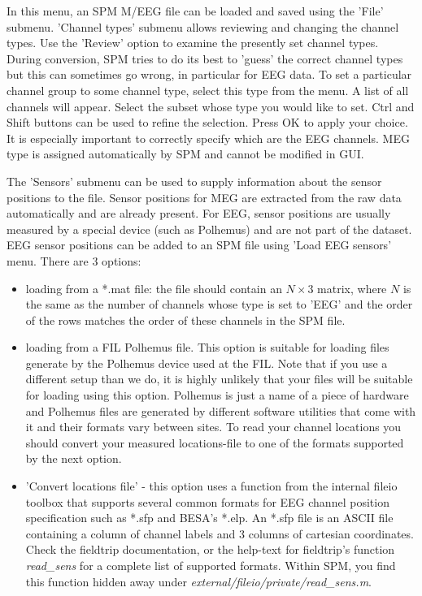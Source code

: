 In this menu, an SPM M/EEG file can be loaded and saved using the 'File'
submenu. 'Channel types' submenu allows reviewing and
changing the channel types. Use the 'Review' option to examine the
presently set channel types. During conversion, SPM tries to do its
best to 'guess' the correct channel types but this can sometimes go
wrong, in particular for EEG data. To set a particular channel group
to some channel type, select this type from the menu. A list of all
channels will appear. Select the subset whose type you would like to
set. Ctrl and Shift buttons can be used to refine the selection. Press
OK to apply your choice. It is especially important to correctly specify
which are the EEG channels. MEG type is assigned automatically by SPM
and cannot be modified in GUI.  

The 'Sensors' submenu can be used to supply information about the
sensor positions to the file. Sensor positions for MEG are extracted
from the raw data automatically and are already present. For EEG,
sensor positions are usually measured by a special device (such as
Polhemus) and are not part of the dataset. EEG sensor positions can be
added to an SPM file using 'Load EEG sensors' menu. There are 3
options:

\begin{itemize}
\item	loading from a *.mat file: the file should contain an $N
  \times 3$ matrix, where $N$ is the same as the number of channels
  whose type is set to 'EEG' and the order of the rows matches the
  order of these channels in the SPM file.   

\item	loading from a FIL Polhemus file. This option is suitable for
  loading files generate by the Polhemus device used at the FIL. Note
  that if you use a different setup than we do, it is highly unlikely
  that your files will be suitable for loading using this
  option. Polhemus is just a name of a piece of hardware and Polhemus
  files are generated by different software utilities that come with
  it and their formats vary between sites. To read your channel
  locations you should convert your measured locations-file to one of
  the  formats supported by the next option.  

\item	'Convert locations file' - this option uses a function from
  the internal fileio toolbox that supports several common formats for
  EEG channel position specification such as *.sfp and
  BESA's *.elp. An *.sfp file is an ASCII file containing a column of
  channel labels and 3 columns of cartesian coordinates. Check the
  fieldtrip documentation, or the help-text for fieldtrip's function
  \textit{read\_sens} for a complete list of supported formats. Within SPM,
  you find this function hidden away under
  \textit{external/fileio/private/read\_sens.m}.  

\end{itemize}

